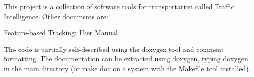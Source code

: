 This project is a collection of software tools for transportation called Traffic Intelligence. Other documents are\-:


\begin{DoxyItemize}
\item \hyperlink{feature_based_tracking}{Feature-\/based Tracking\-: User Manual}
\end{DoxyItemize}

The code is partially self-\/described using the doxygen tool and comment formatting. The documentation can be extracted using doxygen, typing {\ttfamily doxygen} in the main directory (or {\ttfamily make doc} on a system with the Makefile tool installed). 